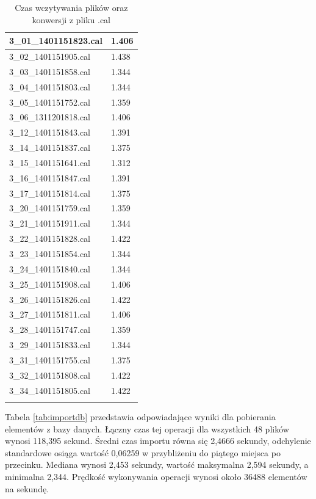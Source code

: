 \begin{longtable}{|l|l|}
    3\_01\_1401151823.cal & 1.406 \\ \hline
    3\_02\_1401151905.cal & 1.438 \\ \hline
    3\_03\_1401151858.cal & 1.344 \\ \hline
    3\_04\_1401151803.cal & 1.344 \\ \hline
    3\_05\_1401151752.cal & 1.359 \\ \hline
    3\_06\_1311201818.cal & 1.406 \\ \hline
    3\_12\_1401151843.cal & 1.391 \\ \hline
    3\_14\_1401151837.cal & 1.375 \\ \hline
    3\_15\_1401151641.cal & 1.312 \\ \hline
    3\_16\_1401151847.cal & 1.391 \\ \hline
    3\_17\_1401151814.cal & 1.375 \\ \hline
    3\_20\_1401151759.cal & 1.359 \\ \hline
    3\_21\_1401151911.cal & 1.344 \\ \hline
    3\_22\_1401151828.cal & 1.422 \\ \hline
    3\_23\_1401151854.cal & 1.344 \\ \hline
    3\_24\_1401151840.cal & 1.344 \\ \hline
    3\_25\_1401151908.cal & 1.406 \\ \hline
    3\_26\_1401151826.cal & 1.422 \\ \hline
    3\_27\_1401151811.cal & 1.406 \\ \hline
    3\_28\_1401151747.cal & 1.359 \\ \hline
    3\_29\_1401151833.cal & 1.344 \\ \hline
    3\_31\_1401151755.cal & 1.375 \\ \hline
    3\_32\_1401151808.cal & 1.422 \\ \hline
    3\_34\_1401151805.cal & 1.422 \\ \hline
    \caption{Czas wczytywania plików oraz konwersji z pliku .cal}
    \label{tab:fileimport}
\end{longtable}
Tabela \ref{tab:importdb} przedstawia odpowiadające wyniki dla pobierania elementów z bazy danych. Łączny czas tej operacji dla wszystkich 48 plików wynosi 118,395 sekund. Średni czas importu równa się 2,4666 sekundy, odchylenie standardowe osiąga wartość 0,06259 w przybliżeniu do piątego miejsca po przecinku. Mediana wynosi 2,453 sekundy, wartość maksymalna 2,594 sekundy, a minimalna 2,344. Prędkość wykonywania operacji wynosi około 36488 elementów na sekundę.
